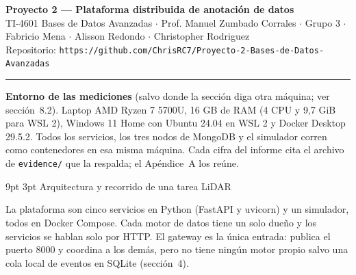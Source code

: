 \documentclass[10pt,letterpaper]{article}
\makeatletter
\renewcommand\section{\@startsection{section}{1}{\z@}%
  {9pt \@plus 2pt \@minus 1pt}{3pt}%
  {\normalfont\large\bfseries\color{acc}}}
\makeatother
\begin{document}
{\LARGE\bfseries\color{acc} Proyecto 2 --- Plataforma distribuida de anotación de datos}\\[2pt]
{\footnotesize\color{gris} TI-4601 Bases de Datos Avanzadas $\cdot$ Prof. Manuel Zumbado Corrales $\cdot$ Grupo 3 $\cdot$ Fabricio Mena $\cdot$ Alisson Redondo $\cdot$ Christopher Rodriguez}\\
{\footnotesize\color{gris} Repositorio: \texttt{https://github.com/ChrisRC7/Proyecto-2-Bases-de-Datos-Avanzadas}}

\vspace{4pt}\hrule\vspace{6pt}

\textbf{Entorno de las mediciones} (salvo donde la sección diga otra máquina; ver sección~8.2). Laptop AMD Ryzen 7 5700U, 16 GB de RAM (4 CPU y 9,7 GiB para
WSL 2), Windows 11 Home con Ubuntu 24.04 en WSL 2 y Docker Desktop 29.5.2. Todos los servicios, los tres
nodos de MongoDB y el simulador corren como contenedores en esa misma máquina. Cada cifra del informe cita
el archivo de \texttt{evidence/} que la respalda; el Apéndice~A los reúne.

\section{Arquitectura y recorrido de una tarea LiDAR}

La plataforma son cinco servicios en Python (FastAPI y uvicorn) y un simulador, todos en Docker Compose.
Cada motor de datos tiene un solo dueño y los servicios se hablan solo por HTTP. El gateway es la única
entrada: publica el puerto 8000 y coordina a los demás, pero no tiene ningún motor propio salvo una cola
local de eventos en SQLite (sección~4).
\end{document}
